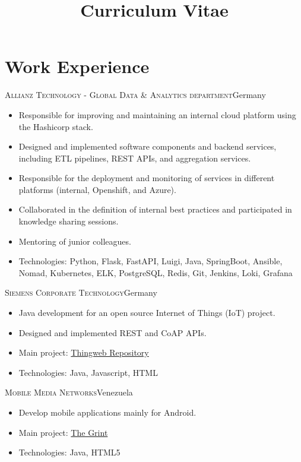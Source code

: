 \documentclass[10pt]{moderncv}
\title{Curriculum Vitae}
\begin{document}
\maketitle

\section{Work Experience}


{\textsc{Allianz Technology - Global Data \& Analytics department}}{Germany}{}{%
\begin{itemize}
    \item Responsible for improving and maintaining an internal cloud platform using the Hashicorp stack.
    \item Designed and implemented software components and backend services, including ETL pipelines, REST APIs, and aggregation services.
    \item Responsible for the deployment and monitoring of services in different platforms (internal, Openshift, and Azure).
    \item Collaborated in the definition of internal best practices and participated in knowledge sharing sessions.
    \item Mentoring of junior colleagues.
    \item Technologies: Python, Flask, FastAPI, Luigi, Java, SpringBoot, Ansible, Nomad, Kubernetes, ELK, PostgreSQL, Redis, Git, Jenkins, Loki, Grafana
\end{itemize}
}

{\textsc{Siemens Corporate Technology}}{Germany}{}{%
\begin{itemize}
  \item Java development for an open source Internet of Things (IoT) project.
  \item Designed and implemented REST and CoAP APIs.
  \item Main project: \href{https://github.com/thingweb/thingweb-repository}{Thingweb Repository}
  \item Technologies: Java, Javascript, HTML
\end{itemize}
}

{\textsc{Mobile Media Networks}}{Venezuela}{}{%
\begin{itemize}
  \item Develop mobile applications mainly for Android.
  \item Main project: \href{https://www.thegrint.com}{The Grint}
  \item Technologies: Java, HTML5
\end{itemize}
}
\end{document}
